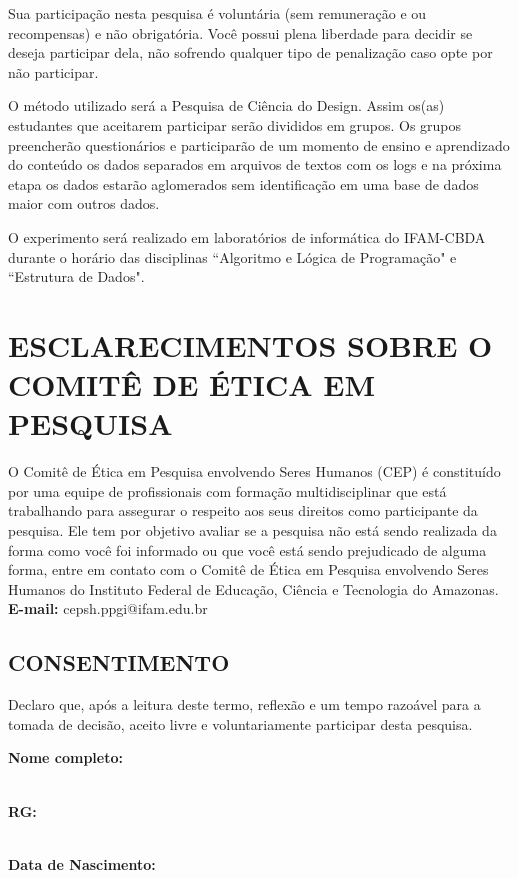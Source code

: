 \documentclass[12pt,a4paper]{article}
\newcommand{\formfield}[2][1]{%
	\textcolor{labelcolor}{\textbf{#2}} \\[0.3cm]
	\textcolor{linecolor}{\makebox[\linewidth]{\hrulefill}} \\[#1cm]
}
\begin{document}
Sua participação nesta pesquisa é voluntária (sem remuneração e ou recompensas) e não obrigatória. Você possui plena liberdade para decidir se deseja participar dela, não sofrendo qualquer tipo de penalização caso opte por não participar. 

O método utilizado será a Pesquisa de Ciência do Design. Assim os(as) estudantes que aceitarem participar serão divididos em grupos. Os grupos preencherão questionários e participarão de um momento de ensino e aprendizado do conteúdo os dados separados em arquivos de textos com os logs e na próxima etapa os dados estarão aglomerados sem identificação em uma base de dados maior com outros dados. 

O experimento será realizado em laboratórios de informática do IFAM-CBDA durante o horário das disciplinas ``Algoritmo e Lógica de Programação" e ``Estrutura de Dados".


\section*{ESCLARECIMENTOS SOBRE O COMITÊ DE ÉTICA EM PESQUISA}
 O Comitê de Ética em Pesquisa envolvendo Seres Humanos (CEP) é constituído por uma equipe de profissionais com formação multidisciplinar que está trabalhando para assegurar o respeito aos seus direitos como participante da pesquisa. Ele tem por objetivo avaliar se a pesquisa não está sendo realizada da forma como você foi informado ou que você está sendo prejudicado de alguma forma, entre em contato com o Comitê de Ética em Pesquisa envolvendo Seres Humanos do Instituto Federal de Educação, Ciência e Tecnologia do Amazonas. \textbf{E-mail:} cepsh.ppgi@ifam.edu.br
\newpage
\subsection*{CONSENTIMENTO}

Declaro que, após a leitura deste termo, reflexão e um tempo razoável para a tomada de decisão, aceito livre e voluntariamente participar desta pesquisa.\\[1cm]

\noindent
\begin{minipage}{\textwidth}
	\formfield[1.2]{Nome completo:}
\end{minipage}

\noindent
\begin{minipage}[t]{0.48\textwidth}
	\formfield[1]{RG:}
\end{minipage}%
\hfill
\begin{minipage}[t]{0.48\textwidth}
	\formfield[1]{Data de Nascimento:}
\end{minipage}
\end{document}
